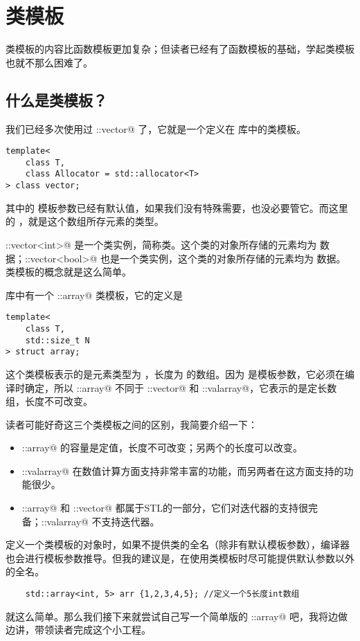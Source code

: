 \section{类模板}
类模板的内容比函数模板更加复杂；但读者已经有了函数模板的基础，学起类模板也就不那么困难了。\par
\subsection*{什么是类模板？}
我们已经多次使用过 \lstinline@std::vector@ 了，它就是一个定义在 \lstinline@vector@ 库中的类模板。
\begin{lstlisting}
template<
    class T,
    class Allocator = std::allocator<T>
> class vector;
\end{lstlisting}
其中的 \lstinline@Allocator@ 模板参数已经有默认值，如果我们没有特殊需要，也没必要管它。而这里的 \lstinline@T@，就是这个数组所存元素的类型。\par
\lstinline@std::vector<int>@ 是一个类实例，简称类。这个类的对象所存储的元素均为 \lstinline@int@ 数据；\newline\lstinline@std::vector<bool>@ 也是一个类实例，这个类的对象所存储的元素均为 \lstinline@bool@ 数据。类模板的概念就是这么简单。\par
\lstinline@array@ 库中有一个 \lstinline@std::array@ 类模板，它的定义是
\begin{lstlisting}
template<
    class T,
    std::size_t N
> struct array;
\end{lstlisting}
这个类模板表示的是元素类型为 \lstinline@T@，长度为 \lstinline@N@ 的数组。因为 \lstinline@N@ 是模板参数，它必须在编译时确定，所以 \lstinline@std::array@ 不同于 \lstinline@std::vector@ 和 \lstinline@std::valarray@，它表示的是定长数组，长度不可改变。\par
读者可能好奇这三个类模板之间的区别，我简要介绍一下：
\begin{itemize}
    \item \lstinline@std::array@ 的容量是定值，长度不可改变；另两个的长度可以改变。
    \item \lstinline@std::valarray@ 在数值计算方面支持非常丰富的功能，而另两者在这方面支持的功能很少。
    \item \lstinline@std::array@ 和 \lstinline@std::vector@ 都属于STL的一部分，它们对迭代器的支持很完备；\lstinline@std::valarray@ 不支持迭代器。
\end{itemize}\pagebreak
定义一个类模板的对象时，如果不提供类的全名（除非有默认模板参数），编译器也会进行模板参数推导。但我的建议是，在使用类模板时尽可能提供默认参数以外的全名。
\begin{lstlisting}
    std::array<int, 5> arr {1,2,3,4,5}; //定义一个5长度int数组
\end{lstlisting}
就这么简单。那么我们接下来就尝试自己写一个简单版的 \lstinline@user::array@ 吧，我将边做边讲，带领读者完成这个小工程。
